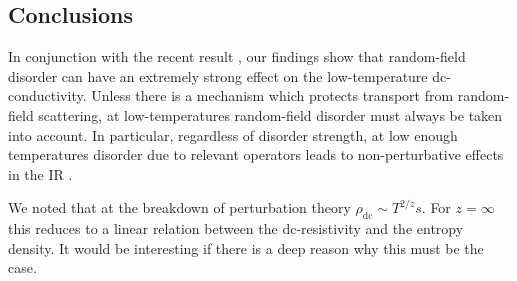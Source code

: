 \documentclass[10pt, oneside]{book}
\begin{document}
\begin{doublespace}
 
 

\section{Conclusions}
In conjunction with the recent result \cite{Hartnoll:2014gba}, our findings show that random-field disorder can have an extremely strong effect on the low-temperature dc-conductivity.  Unless there is a mechanism which protects transport from random-field scattering, at low-temperatures random-field disorder must always be taken into account.    In particular, regardless of disorder strength, at low enough temperatures disorder due to relevant operators leads to non-perturbative effects in the IR \cite{robertson, adrian, erica, laimei}.

We noted that at the breakdown of perturbation theory $\rho_{\mathrm{dc}}\sim T^{2/z} s$. For $z=\infty$ this reduces to a linear relation between the dc-resistivity and the entropy density. It would be interesting if there is a deep reason why this must be the case.


\end{doublespace}
\end{document}
